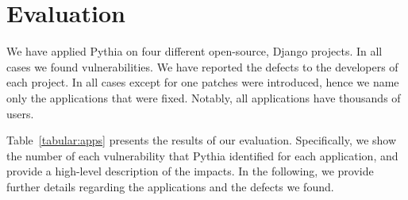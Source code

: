 \section{Evaluation}
\label{sec:eval}

We have applied Pythia on four
different open-source,
Django projects.
In all cases we found vulnerabilities.
We have reported the defects to
the developers of each project.
In all cases except for one patches were introduced,
hence we name only the applications that were fixed.
Notably,
all applications have thousands of users.

Table~\ref{tabular:apps} presents the results
of our evaluation.
Specifically,
we show the number of each vulnerability
that Pythia identified for each application,
and provide a high-level
description of the impacts.
In the following,
we provide further details
regarding the applications and the defects we found.





